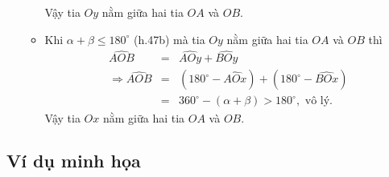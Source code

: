 \begin{enumerate}
\begin{itemize}
	Vậy tia $Oy$ nằm giữa hai tia $OA$ và $OB$.
	\item Khi $\alpha+\beta\leq 180^\circ$ (h.47b) mà tia $Oy$ nằm giữa hai tia $OA$ và $OB$ thì 
	\begin{eqnarray*}
		\widehat{AOB}&=&\widehat{AOy}+\widehat{BOy}\\
		\Rightarrow \widehat{AOB}&=& \left(180^\circ-\widehat{AOx}\right)+\left(180^\circ-\widehat{BOx}\right)\\
		&=&360^\circ-(\alpha+\beta)>180^\circ,\text{ vô lý}.
	\end{eqnarray*}
Vậy tia $Ox$ nằm giữa hai tia $OA$ và $OB$.
\end{itemize}
\end{enumerate}
\subsection{Ví dụ minh họa}
